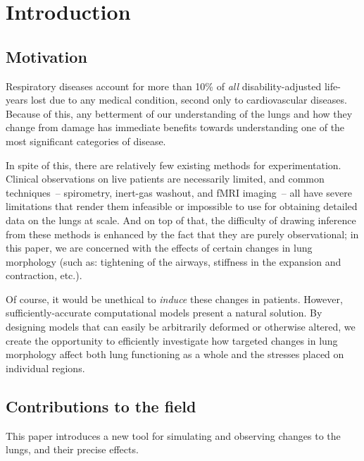 %
\section{Introduction}

\subsection{Motivation}

Respiratory diseases account for more than 10\% of \textit{all} disability-adjusted life-years lost
due to any medical condition, second only to cardiovascular diseases.\cite{GlobalImpact} Because
of this, any betterment of our understanding of the lungs and how they change from damage has
immediate benefits towards understanding one of the most significant categories of disease.

In spite of this, there are relatively few existing methods for experimentation. Clinical
observations on live patients are necessarily limited, and common techniques~-- spirometry,
inert-gas washout, and fMRI imaging~-- all have severe limitations that render them infeasible or
impossible to use for obtaining detailed data on the lungs at scale. And on top of that, the
difficulty of drawing inference from these methods is enhanced by the fact that they are purely
observational; in this paper, we are concerned with the effects of certain changes in lung
morphology (such as: tightening of the airways, stiffness in the expansion and contraction, etc.).

Of course, it would be unethical to \textit{induce} these changes in patients. However,
sufficiently-accurate computational models present a natural solution. By designing models that can
easily be arbitrarily deformed or otherwise altered, we create the opportunity to efficiently
investigate how targeted changes in lung morphology affect both lung functioning as a whole and the
stresses placed on individual regions.


\subsection{Contributions to the field}

This paper introduces a new tool for simulating and observing changes to the lungs, and their
precise effects.

